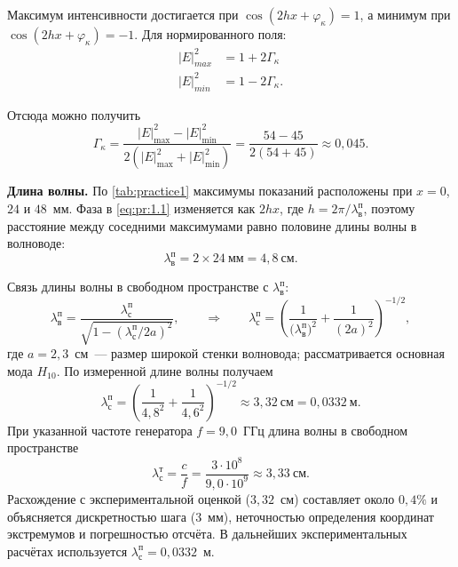 Максимум интенсивности достигается при $\cos(2hx + \varphi_\kappa) = 1$, а минимум при $\cos(2hx + \varphi_\kappa) = -1$. Для нормированного поля:
\begin{align*}
	|E|^2_{max}& = 1 + 2\Gamma_\kappa \\
	|E|^2_{min}& = 1 - 2\Gamma_\kappa.
\end{align*}


Отсюда можно получить
\begin{equation}
	\Gamma_\kappa
	= \frac{|E|^2_{\max} - |E|^2_{\min}}{2(|E|^2_{\max} + |E|^2_{\min})}
	= \frac{54 - 45}{2(54 + 45)}
	\approx 0{,}045.
	\label{eq:pr:1.2}
\end{equation}



\noindent\textbf{Длина волны.}
По \cref{tab:practice1} максимумы показаний расположены при $x = 0$, $24$ и $48$~мм. Фаза в \cref{eq:pr:1.1} изменяется как $2hx$, где $h = 2\pi/{\lambda^{\text{п}}_{\text{в}}}$, поэтому расстояние между соседними максимумами равно половине длины волны в волноводе:
\begin{equation}
	{\lambda^{\text{п}}_{\text{в}}} =2 \times 24~\text{мм} = 4{,}8~\text{см}.
\end{equation}

Связь длины волны в свободном пространстве с ${\lambda^{\text{п}}_{\text{в}}}$:
\begin{equation}
	{\lambda^{\text{п}}_{\text{в}}} = \frac{{\lambda^{\text{п}}_{\text{с}}}}{\sqrt{1 - ({\lambda^{\text{п}}_{\text{с}}}/2a)^2}},
	\qquad\Longrightarrow\qquad
	{\lambda^{\text{п}}_{\text{с}}} = \left(\frac{1}{\bigl(\lambda^{\text{п}}_{\text{в}}\bigr)^2} + \frac{1}{(2a)^2}\right)^{-1/2},
\end{equation}
где $a = 2{,}3$~см~--- размер широкой стенки волновода; рассматривается основная мода $H_{10}$. По измеренной длине волны получаем
\begin{equation}
	{\lambda^{\text{п}}_{\text{с}}} = \left(\frac{1}{4{,}8^2} + \frac{1}{4{,}6^2}\right)^{-1/2}
	\approx 3{,}32~\text{см} = 0{,}0332~\text{м}.
\end{equation}
При указанной частоте генератора $f = 9{,}0$~ГГц длина волны в свободном пространстве
\begin{equation}
	{\lambda^{\text{т}}_{\text{с}}} = \frac{c}{f}
	= \frac{3 \cdot 10^8}{9{,}0 \cdot 10^9}
	\approx 3{,}33~\text{см}.
\end{equation}
Расхождение с экспериментальной оценкой ($3{,}32$~см) составляет около $0{,}4\%$ и объясняется дискретностью шага ($3$~мм), неточностью определения координат экстремумов и погрешностью отсчёта. В дальнейших экспериментальных расчётах используется ${\lambda^{\text{п}}_{\text{с}}} = 0{,}0332$~м.

